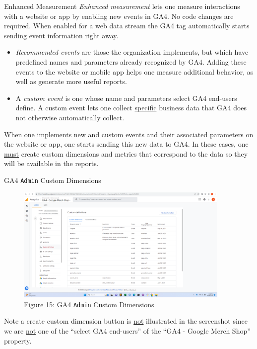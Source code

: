 \documentclass[pdf]{beamer}
\theoremstyle{remark}
\theoremstyle{definition}
\begin{document}
\begin{frame}[t]{Enhanced Measurement}
\small
\textit{Enhanced measurement} lets one measure interactions with a website or app by enabling new events in GA4. No code changes are required.  When enabled for a web data stream the GA4 tag automatically starts sending event information right away. \\
\vspace{1.5ex}
\begin{itemize}
  \item \textit{Recommended events} are those the organization implements, but which have predefined names and parameters already recognized by GA4. Adding these events to the website or mobile app helps one measure additional behavior, as well as generate more useful reports.
  \item  A \textit{custom event} is one whose name and parameters select GA4 end-users define. A custom event lets one collect \underline{specific} business data that GA4 does not otherwise automatically collect.  
\end{itemize}
When one implements new and custom events and their associated parameters on the website or app, one starts sending this new data to GA4. In these cases, one \underline{must} create custom dimensions and metrics that correspond to the data so they will be available in the reports.
\end{frame}

\begin{frame}[t]{GA4 \texttt{Admin} Custom Dimensions}
\begin{figure}[htbp]
  \captionsetup{justification=centering}
  \includegraphics[height=5.6cm, trim=1.5cm 0.0cm 2.0cm 0.0cm width=5.6cm]{Images/G4A_7b_091923_Admin_Customdefinitions_Customdimensions.png}
  \caption{Figure {\color{franklinblue} 15}: GA4 \texttt{Admin} Custom Dimensions}
\end{figure}
\vspace{-2.0ex}
\small
Note a {\color{blue} create custom dimension} button is \underline{not} illustrated in the screenshot since we are \underline{not} one of the ``select GA4 end-users'' of the ``GA4 - Google Merch Shop'' property. 
\end{frame}
\end{document}
